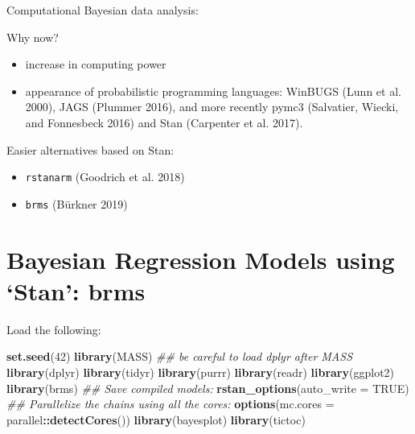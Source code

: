 \documentclass[12pt,ignorenonframetext,aspectratio=169]{beamer}
\newenvironment{Shaded}{\begin{snugshade}}{\end{snugshade}}
\newcommand{\CommentTok}[1]{\textcolor[rgb]{0.56,0.35,0.01}{\textit{#1}}}
\newcommand{\DataTypeTok}[1]{\textcolor[rgb]{0.13,0.29,0.53}{#1}}
\newcommand{\DecValTok}[1]{\textcolor[rgb]{0.00,0.00,0.81}{#1}}
\newcommand{\KeywordTok}[1]{\textcolor[rgb]{0.13,0.29,0.53}{\textbf{#1}}}
\newcommand{\NormalTok}[1]{#1}
\newcommand{\OperatorTok}[1]{\textcolor[rgb]{0.81,0.36,0.00}{\textbf{#1}}}
\newcommand{\OtherTok}[1]{\textcolor[rgb]{0.56,0.35,0.01}{#1}}
\providecommand{\tightlist}{%
  \setlength{\itemsep}{0pt}\setlength{\parskip}{0pt}}
\begin{document}
\begin{frame}[fragile]{Computational Bayesian data analysis:}
\protect\hypertarget{computational-bayesian-data-analysis}{}

\begin{block}{Why now?}

\begin{itemize}
\tightlist
\item
  increase in computing power
\item
  appearance of probabilistic programming languages: WinBUGS (Lunn et al. 2000), JAGS (Plummer 2016), and more recently pymc3 (Salvatier, Wiecki, and Fonnesbeck 2016) and Stan (Carpenter et al. 2017).
\end{itemize}

\end{block}

\begin{block}{Easier alternatives based on Stan:}

\begin{itemize}
\tightlist
\item
  \texttt{rstanarm} (Goodrich et al. 2018)
\item
  \texttt{brms} (Bürkner 2019)
\end{itemize}

\end{block}

\end{frame}

\hypertarget{bayesian-regression-models-using-stan-brms}{%
\section{Bayesian Regression Models using `Stan': brms}\label{bayesian-regression-models-using-stan-brms}}

\begin{frame}[fragile]{Load the following:}
\protect\hypertarget{load-the-following}{}

\scriptsize

\begin{Shaded}
\begin{Highlighting}[]
\KeywordTok{set.seed}\NormalTok{(}\DecValTok{42}\NormalTok{)}
\KeywordTok{library}\NormalTok{(MASS)}
\CommentTok{## be careful to load dplyr after MASS}
\KeywordTok{library}\NormalTok{(dplyr)}
\KeywordTok{library}\NormalTok{(tidyr)}
\KeywordTok{library}\NormalTok{(purrr)}
\KeywordTok{library}\NormalTok{(readr)}
\KeywordTok{library}\NormalTok{(ggplot2)}
\KeywordTok{library}\NormalTok{(brms)}
\CommentTok{## Save compiled models:}
\KeywordTok{rstan_options}\NormalTok{(}\DataTypeTok{auto_write =} \OtherTok{TRUE}\NormalTok{)}
\CommentTok{## Parallelize the chains using all the cores:}
\KeywordTok{options}\NormalTok{(}\DataTypeTok{mc.cores =}\NormalTok{ parallel}\OperatorTok{::}\KeywordTok{detectCores}\NormalTok{())}
\KeywordTok{library}\NormalTok{(bayesplot)}
\KeywordTok{library}\NormalTok{(tictoc)}
\end{Highlighting}
\end{Shaded}

\normalsize

\end{frame}
\end{document}
